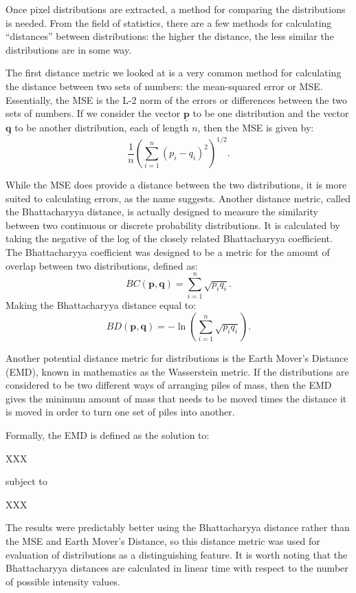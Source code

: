 Once pixel distributions are extracted, a method for comparing the distributions is needed.
From the field of statistics, there are a few methods for calculating ``distances'' between distributions: the higher the distance, the less similar the distributions are in some way.

The first distance metric we looked at is a very common method for calculating the distance between two sets of numbers: the mean-squared error or MSE.
Essentially, the MSE is the L-2 norm of the errors or differences between the two sets of numbers.
If we consider the vector $\underline{\mathbf{p}}$ to be one distribution and the vector $\underline{\mathbf{q}}$ to be another distribution, each of length $n$, then the MSE is given by:
\begin{equation}
\frac{1}{n} \left( \sum_{i=1}^n{(p_i-q_i)^2} \right)^{1/2} .
\end{equation}

While the MSE does provide a distance between the two distributions, it is more suited to calculating errors, as the name suggests.
Another distance metric, called the Bhattacharyya distance, is actually designed to measure the similarity between two continuous or discrete probability distributions.
It is calculated by taking the negative of the log of the closely related Bhattacharyya coefficient.
The Bhattacharyya coefficient was designed to be a metric for the amount of overlap between two distributions, defined as:
\begin{equation}
BC(\mathbf{p}, \mathbf{q}) = \sum_{i=1}^n{\sqrt{p_iq_i}} .
\end{equation}
Making the Bhattacharyya distance equal to:
\begin{equation}
BD(\mathbf{p}, \mathbf{q}) = - \ln \left( \sum_{i=1}^n {\sqrt{p_iq_i}} \right) .
\end{equation}

Another potential distance metric for distributions is the Earth Mover's Distance (EMD), known in mathematics as the Wasserstein metric.
If the distributions are considered to be two different ways of arranging piles of mass, then the EMD gives the minimum amount of mass that needs to be moved times the distance it is moved in order to turn one set of piles into another.

Formally, the EMD is defined as the solution to:

XXX

subject to 

XXX


The results were predictably better using the Bhattacharyya distance rather than the MSE and Earth Mover's Distance, so this distance metric was used for evaluation of distributions as a distinguishing feature.
It is worth noting that the Bhattacharyya distances are calculated in linear time with respect to the number of possible intensity values.


